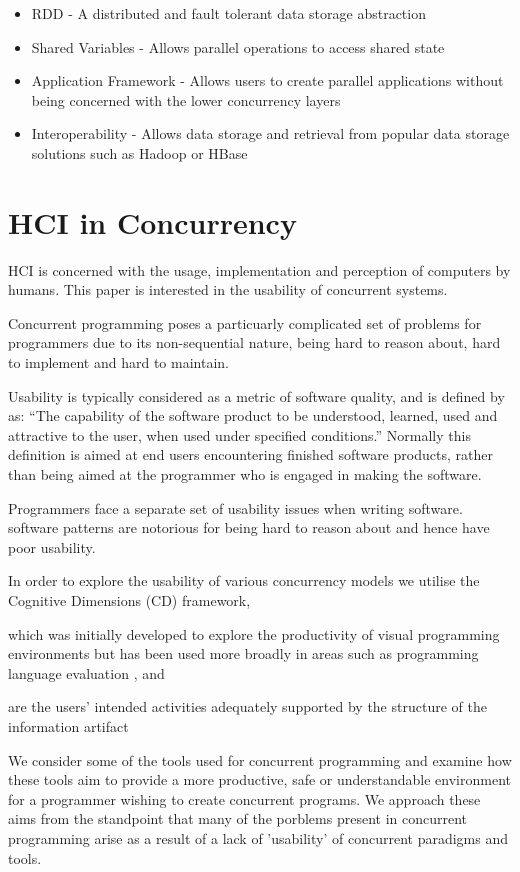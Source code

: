 \documentclass{sig-alternate}
\begin{document}
\begin{itemize}
\item RDD - A distributed and fault tolerant data storage abstraction
\item Shared Variables - Allows parallel operations to access shared state
\item Application Framework - Allows users to create parallel applications without being concerned with the lower concurrency layers
\item Interoperability - Allows data storage and retrieval from popular data storage solutions such as Hadoop or HBase
\end{itemize}

\section{HCI in Concurrency}
HCI is concerned with the usage, implementation and perception of computers by humans. This paper is interested in the usability of concurrent systems. 

Concurrent programming poses a particuarly complicated set of problems for programmers due to its non-sequential nature, being hard to reason about, hard to implement and hard to maintain. 


Usability is typically considered as a metric of software quality, and is defined by \cite{9126} as: ``The capability of the software product to be understood, learned, used and attractive to the user, when used under specified conditions.'' Normally this definition is aimed at end users encountering finished software products, rather than being aimed at the programmer who is engaged in making the software.

Programmers face a separate set of usability issues when writing software.  software patterns are notorious for being hard to reason about and hence have poor usability.

In order to explore the usability of various concurrency models we utilise the Cognitive Dimensions \cite{green89:_cognit_dimen_notat} (CD) framework, 

which was initially developed to explore the productivity of visual programming environments but has been used more broadly in areas such as programming language evaluation \cite{enpl}, and 

are the users’ intended activities adequately supported by the structure of the information artifact

We consider some of the tools used for concurrent programming and examine how these tools aim to provide a more productive, safe or understandable environment for a programmer wishing to create concurrent programs. We approach these aims from the standpoint that many of the porblems present in concurrent programming arise as a result of a lack of 'usability' of concurrent paradigms and tools.
\end{document}
